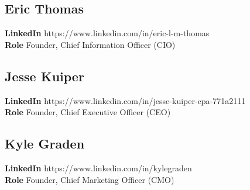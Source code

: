 \documentclass[11pt]{article}
\begin{document}
\subsection{Eric Thomas}
\begin{minipage}{\textwidth}
\textbf{LinkedIn} https://www.linkedin.com/in/eric-l-m-thomas\\
\textbf{Role} Founder, Chief Information Officer (CIO)\\
\end{minipage}

\subsection{Jesse Kuiper}
\begin{minipage}{\textwidth}
\textbf{LinkedIn} https://www.linkedin.com/in/jesse-kuiper-cpa-771a2111\\
\textbf{Role} Founder, Chief Executive Officer (CEO)\\
\end{minipage}

\subsection{Kyle Graden}
\begin{minipage}{\textwidth}
\textbf{LinkedIn} https://www.linkedin.com/in/kylegraden\\
\textbf{Role} Founder, Chief Marketing Officer (CMO)\\
\end{minipage}

\pagebreak

\printbibliography

\vspace*{\fill}

\begin{flushright}

\pdfcreationdate
\end{flushright}
\end{document}
